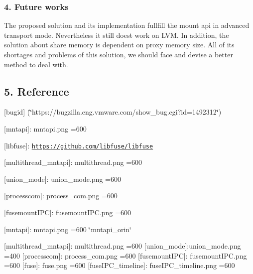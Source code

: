 \subsubsection*{4. Future works}

The proposed solution and its implementation fullfill the mount api in advanced transport mode. Nevertheless it still does\textquotesingle{}t work on L\+VM. In addition, the solution about share memory is dependent on proxy memory size. All of its shortages and problems of this solution, we should face and devise a better method to deal with.

\subsection*{5. Reference}


\begin{DoxyEnumerate}
\item \mbox{[}bugid\mbox{]} (\char`\"{}https\+://bugzilla.\+eng.\+vmware.\+com/show\+\_\+bug.\+cgi?id=1492312\char`\"{})
\item \mbox{[}mntapi\mbox{]}\+: mntapi.\+png =600
\item \mbox{[}libfuse\mbox{]}\+: \href{https://github.com/libfuse/libfuse}{\tt https\+://github.\+com/libfuse/libfuse}
\item \mbox{[}multithread\+\_\+mntapi\mbox{]}\+: multithread.\+png =600
\item \mbox{[}union\+\_\+mode\mbox{]}\+: union\+\_\+mode.\+png =600
\item \mbox{[}processcom\mbox{]}\+: process\+\_\+com.\+png =600
\item \mbox{[}fusemount\+I\+PC\mbox{]}\+: fusemount\+I\+P\+C.\+png =600
\end{DoxyEnumerate}

\mbox{[}mntapi\mbox{]}\+: mntapi.\+png =600 \char`\"{}mntapi\+\_\+orin\char`\"{}

\mbox{[}multithread\+\_\+mntapi\mbox{]}\+: multithread.\+png =600 \mbox{[}union\+\_\+mode\mbox{]}\+:union\+\_\+mode.\+png =400 \mbox{[}processcom\mbox{]}\+: process\+\_\+com.\+png =600 \mbox{[}fusemount\+I\+PC\mbox{]}\+: fusemount\+I\+P\+C.\+png =600 \mbox{[}fuse\mbox{]}\+: fuse.\+png =600 \mbox{[}fuse\+I\+P\+C\+\_\+timeline\mbox{]}\+: fuse\+I\+P\+C\+\_\+timeline.\+png =600 